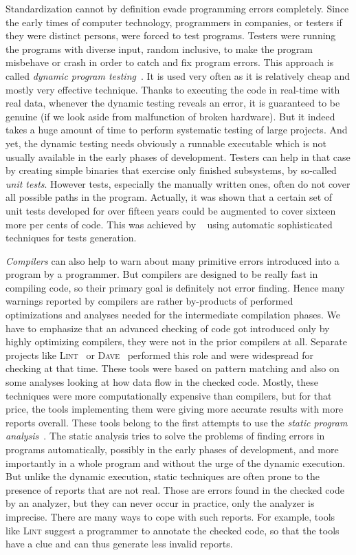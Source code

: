 Standardization cannot by definition evade programming errors completely.
Since the early times of computer technology, programmers in companies, or
testers if they were distinct persons, were forced to test programs.  Testers
were running the programs with diverse input, random inclusive, to make the
program misbehave or crash in order to catch and fix program errors.  This
approach is called \emph{dynamic program testing}~\cite{sw_testing}. It is
used very often as it is relatively cheap and mostly very effective technique.
Thanks to executing the code in real-time with real data, whenever the dynamic
testing reveals an error, it is guaranteed to be genuine (if we look aside
from malfunction of broken hardware).  But it indeed takes a huge amount of
time to perform systematic testing of large projects. And yet, the dynamic
testing needs obviously a runnable executable which is not usually available
in the early phases of development.  Testers can help in that case by creating
simple binaries that exercise only finished subsystems, by so-called
\emph{unit tests}. However tests, especially the manually written ones, often
do not cover all possible paths in the program.  Actually, it was shown that a
certain set of unit tests developed for over fifteen years could be augmented
to cover sixteen more per cents of code. This was achieved by
\klee~\cite{klee} using automatic sophisticated techniques for tests
generation.

\emph{Compilers} can also help to warn about many primitive errors introduced
into a program by a programmer. But compilers are designed to be really fast
in compiling code, so their primary goal is definitely not error finding.
Hence many warnings reported by compilers are rather by-products of performed
optimizations and analyses needed for the intermediate compilation phases. We
have to emphasize that an advanced checking of code got introduced only by
highly optimizing compilers, they were not in the prior compilers at all.
Separate projects like \textsc{Lint}~\cite{lint} or
\textsc{Dave}~\cite{dave} performed this role and were widespread for checking
at that time. These tools were based on pattern matching and also on some
analyses looking at how data flow in the checked code. Mostly, these
techniques were more computationally expensive than compilers, but for that
price, the tools implementing them were giving more accurate results with more
reports overall.  These tools belong to the first attempts to use the
\emph{static program analysis}~\cite{program_analysis}. The static analysis
tries to solve the problems of finding errors in programs automatically,
possibly in the early phases of development, and more importantly in a whole
program and without the urge of the dynamic execution. But unlike the dynamic
execution, static techniques are often prone to the presence of reports that
are not real. Those are errors found in the checked code by an analyzer, but
they can never occur in practice, only the analyzer is imprecise. There are
many ways to cope with such reports.  For example, tools like \textsc{Lint}
suggest a programmer to annotate the checked code, so that the tools have a
clue and can thus generate less invalid reports.

